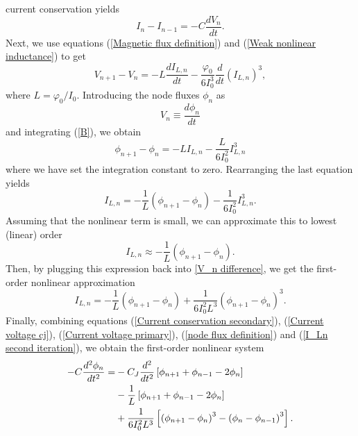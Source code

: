 current conservation yields
\begin{equation}
I_{n}-I_{n-1}=-C\frac{dV_{n}}{dt}.
\label{Current voltage primary}
\end{equation}
Next, we use equations 
(\ref{Magnetic flux definition}) and (\ref{Weak nonlinear inductance}) to get
\begin{equation}
V_{n+1}-V_{n}=-L\frac{dI_{L,n}}{dt}-\frac{\varphi_{0}}{6I_{0}^{3}}\frac{d}{dt}\left( I_{L,n}\right) ^{3},  \label{B}
\end{equation}
where $L=\varphi_{0}/I_{0}.$ Introducing the node fluxes $\phi_{n}$ as
\begin{equation}
V_{n}\equiv \frac{d\phi_{n}}{dt}
\label{node flux definition}
\end{equation}
and integrating (\ref{B}), we obtain
\begin{equation}
\phi_{n+1}-\phi_{n}=-LI_{L,n}-\frac{L}{6I_{0}^{2}}I_{L,n}^{3}
\label{V_n difference}
\end{equation}
where we have set the integration constant to zero. Rearranging the last equation yields
\begin{equation}
I_{L,n}=-\frac{1}{L}\left( \phi_{n+1}-\phi_{n}\right) -\frac{1}{6I_{0}^{2}}I_{L,n}^{3}.
\end{equation}
Assuming that the nonlinear term is small, we can approximate this to lowest (linear) order 
\begin{equation}
I_{L,n}\approx -\frac{1}{L}\left( \phi_{n+1}-\phi_{n}\right) .
\end{equation}
Then, by plugging this expression back into \eqref{V_n difference}, we get the first-order nonlinear approximation
\begin{equation}
I_{L,n}=-\frac{1}{L}\left( \phi_{n+1}-\phi_{n}\right) + \frac{1}{6I_{0}^{2}L^{3}}\left( \phi_{n+1}-\phi_{n}\right) ^{3}.  \label{I_Ln second iteration}
\end{equation}
Finally, combining equations (\ref{Current conservation secondary}), (\ref{Current voltage cj}), (\ref{Current voltage primary}), (\ref{node flux definition}) and (\ref{I_Ln second iteration}), we obtain the first-order nonlinear system
\begin{align}
-C \frac{d^{2}\phi_{n}}{dt^{2}} = &-C_{J}\frac{d^{2}}{dt^{2}}\left[ \phi_{n+1}+\phi_{n-1}-2 \phi_{n}\right]  \notag \\
&-\frac{1}{L}\left[ \phi_{n+1}+\phi_{n-1}-2 \phi_{n}\right]  \notag \\
&+\frac{1}{6I_{0}^{2}L^{3}}\left[ \left( \phi_{n+1}-\phi_{n}\right) ^{3}-\left( \phi_{n}-\phi_{n-1}\right) ^{3}\right].
\label{Discrete wave equation uniform}
\end{align}

